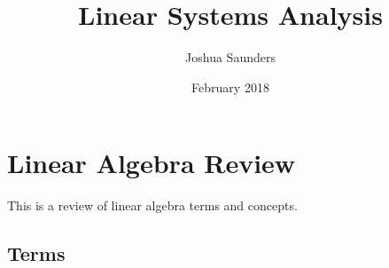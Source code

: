 \documentclass{article}
\title{Linear Systems Analysis}
\author{Joshua Saunders}
\date{February 2018}
\begin{document}
\maketitle

\section{Linear Algebra Review}

This is a review of linear algebra terms and concepts.

\subsection{Terms}



% 
% 
\end{document}
